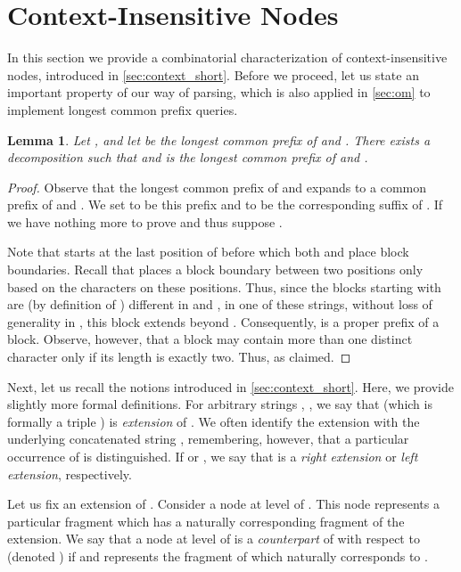 \documentclass[a4paper]{article}
\newtheorem{lemma}[theorem]{Lemma}
\theoremstyle{remark}
\begin{document}
\section{Context-Insensitive Nodes}\label{sec:contexti}
In this section we provide a combinatorial characterization of context-insensitive nodes,
introduced in \cref{sec:context_short}.
Before we proceed, let us state an important property of our way of parsing,
which is also applied in \cref{sec:om} to implement longest common prefix queries.

\begin{lemma}\label{lem:lcpd}
Let ,  and let  be the longest common prefix of  and .
There exists a decomposition  such that  and  is the longest common prefix
of  and .
\end{lemma}
\begin{proof}
Observe that the longest common prefix of  and 
expands to a common prefix of  and . We set  to be this prefix and  to be the corresponding
suffix of . If  we have nothing more to prove and thus suppose .

Note that  starts at the last position of  before which both
 and  place block boundaries.
Recall that  places a block boundary between two positions only based on the characters on these positions.
Thus, since the blocks starting with  are (by definition of ) different in  and ,
in one of these strings, without loss of generality in , this block extends beyond .
Consequently,  is a proper prefix of a block. Observe, however,
that a block may contain more than one distinct character only if its length is exactly two.
Thus,  as claimed.
\end{proof}

Next, let us recall the notions introduced in \cref{sec:context_short}. Here, we provide slightly more formal definitions.
For arbitrary strings , ,  we say that  (which is formally a triple )
is \emph{extension} of . We often identify the extension with the underlying concatenated string ,
remembering, however, that a particular occurrence of  is distinguished.
If  or , we say that  is a \emph{right extension} or \emph{left extension}, respectively.

Let us fix an extension  of . Consider a node  at level  of .
This node represents a particular fragment  which has a naturally corresponding fragment of the extension.
We say that a node  at level  of  is a \emph{counterpart} of  with respect to 
(denoted ) if  and  represents the fragment of  which naturally corresponds to .
\end{document}
